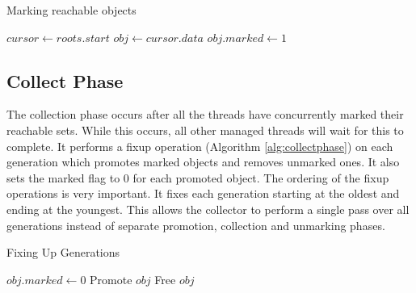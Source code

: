 \documentclass[../diss.tex]{subfiles}
\begin{document}
\begin{algorithm}
\caption{Marking reachable objects}
\label{alg:markphase}
\begin{algorithmic}


\State $cursor\gets roots.start$
\State $obj\gets cursor.data$ 
    \State $obj.marked\gets 1$
        \State{}
    \EndIf
\EndIf
\EndWhile

\EndFunction

\end{algorithmic}
\end{algorithm}

\subsection{Collect Phase}


The collection phase occurs after all the threads have concurrently marked their reachable sets. While this occurs, all other managed threads will wait for this to complete. It performs a fixup operation (Algorithm \ref{alg:collectphase}) on each generation which promotes marked objects and removes unmarked ones. It also sets the marked flag to 0 for each promoted object. The ordering of the fixup operations is very important. It fixes each generation starting at the oldest and ending at the youngest. This allows the collector to perform a single pass over all generations instead of separate promotion, collection and unmarking phases.

\begin{algorithm}
\caption{Fixing Up Generations}
\label{alg:collectphase}
\begin{algorithmic}


    
            \State $obj.marked\gets 0$
                \State Promote $obj$
            \EndIf
        \Else
            \State Free $obj$
        \EndIf
    
    \EndFor

\EndFunction

\end{algorithmic}
\end{algorithm}
\end{document}
